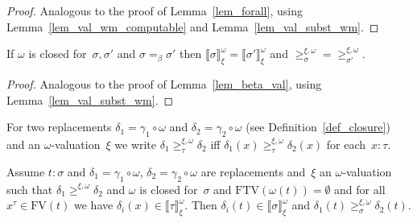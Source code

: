 \documentclass[runningheads,a4paper]{llncs}
\newcommand{\FTV}{\mathrm{FTV}}
\newcommand{\FV}{\mathrm{FV}}
\newcommand{\val}[3]{\ensuremath{\llbracket#1\rrbracket_{#2}^{#3}}}
\newcommand{\gteq}[3]{\ensuremath{\ge_{#1}^{#2,#3}}}
\begin{document}
\begin{proof}
  Analogous to the proof of Lemma~\ref{lem_forall}, using
  Lemma~\ref{lem_val_wm_computable} and Lemma~\ref{lem_val_subst_wm}.
\end{proof}

\begin{lemma}\label{lem_beta_val_wm}
  If $\omega$ is closed for~$\sigma,\sigma'$ and $\sigma =_\beta
  \sigma'$ then $\val{\sigma}{\xi}{\omega} =
  \val{\sigma'}{\xi}{\omega}$ and ${\gteq{\sigma}{\xi}{\omega}} =
      {\gteq{\sigma'}{\xi}{\omega}}$.
\end{lemma}

\begin{proof}
  Analogous to the proof of Lemma~\ref{lem_beta_val}, using
  Lemma~\ref{lem_val_subst_wm}.
\end{proof}

For two replacements $\delta_1 = \gamma_1 \circ \omega$ and $\delta_2
= \gamma_2 \circ \omega$ (see Definition~\ref{def_closure}) and an
$\omega$-valuation~$\xi$ we write $\delta_1 \gteq{\tau}{\xi}{\omega}
\delta_2$ iff $\delta_1(x) \gteq{\tau}{\xi}{\omega} \delta_2(x)$ for
each~$x : \tau$.

\begin{lemma}\label{lem_typable_wm_computable}
  Assume $t : \sigma$ and $\delta_1=\gamma_1\circ\omega$,
  $\delta_2=\gamma_2\circ\omega$ are replacements and~$\xi$ an
  $\omega$-valuation such that $\delta_1 \gteq{}{\xi}{\omega}
  \delta_2$ and $\omega$ is closed for~$\sigma$ and $\FTV(\omega(t)) =
  \emptyset$ and for all $x^\tau \in \FV(t)$ we have $\delta_i(x) \in
  \val{\tau}{\xi}{\omega}$. Then $\delta_i(t) \in
  \val{\sigma}{\xi}{\omega}$ and $\delta_1(t)
  \gteq{\sigma}{\xi}{\omega} \delta_2(t)$.
\end{lemma}
\end{document}

